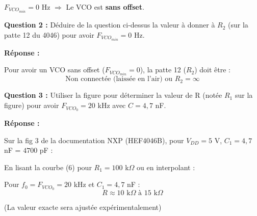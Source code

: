 \documentclass[a4paper,11pt]{article}
\begin{document}
$F_{VCO_{min}} = 0$ Hz $\Rightarrow$ Le VCO est \textbf{sans offset}.

\vspace{0.5cm}
\textbf{Question 2 :} Déduire de la question ci-dessus la valeur à donner à $R_2$ (sur la patte 12 du 4046) pour avoir $F_{VCO_{min}} = 0$ Hz.

\vspace{0.3cm}
\textbf{Réponse :}

Pour avoir un VCO sans offset ($F_{VCO_{min}} = 0$), la patte 12 ($R_2$) doit être :
\[
\boxed{\text{Non connectée (laissée en l'air) ou } R_2 = \infty}
\]

\vspace{0.5cm}
\textbf{Question 3 :} Utiliser la figure pour déterminer la valeur de R (notée $R_1$ sur la figure) pour avoir $F_{VCO_0} = 20$ kHz avec $C = 4{,}7$ nF.

\vspace{0.3cm}
\textbf{Réponse :}

Sur la fig 3 de la documentation NXP (HEF4046B), pour $V_{DD} = 5$ V, $C_1 = 4{,}7$ nF = $4700$ pF :

En lisant la courbe (6) pour $R_1 = 100$ k$\Omega$ ou en interpolant :

Pour $f_0 = F_{VCO_0} = 20$ kHz et $C_1 = 4{,}7$ nF :
\[
\boxed{R \approx 10 \text{ k}\Omega \text{ à } 15 \text{ k}\Omega}
\]

(La valeur exacte sera ajustée expérimentalement)
\end{document}
